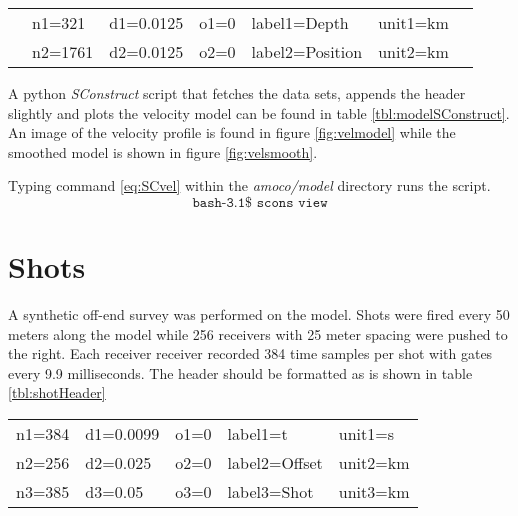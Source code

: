 \begin{center}
{
\begin{tabular}[t]{|clllllc|}
        \hline
          &  n1=321   &      d1=0.0125    &   o1=0        &       label1=Depth  &       unit1=km &  \\
          &  n2=1761  &      d2=0.0125    &   o2=0        &       label2=Position &     unit2=km &  \\
        \hline
\end{tabular}
}
\end{center}

A python \emph{SConstruct} script that fetches the data sets, appends the header slightly and plots the velocity model can be found in table \ref{tbl:modelSConstruct}.  An image of the velocity profile is found in figure \ref{fig:velmodel} while the smoothed model is shown in figure \ref{fig:velsmooth}. 

{
\tiny

\normalsize
}

Typing command \ref{eq:SCvel} within the \emph{amoco\slash model} directory runs the script.
\begin{equation}\label{eq:SCvel} \texttt{bash-3.1\$\ scons\ view} \end{equation}


\section{Shots}
A synthetic off-end survey was performed on the model.  Shots were fired every 50 meters along the model while 256 receivers with 25 meter spacing were pushed to the right.  Each receiver receiver recorded 384 time samples per shot with gates every 9.9 milliseconds.  The header should be formatted as is shown in table \ref{tbl:shotHeader} 

{
\begin{tabular}[frame=single]{|lllll|}
        \hline
    n1=384  &       d1=0.0099  &    o1=0  &        label1=t       &   unit1=s  \\
    n2=256  &       d2=0.025   &    o2=0  &        label2=Offset  &   unit2=km   \\
    n3=385  &       d3=0.05    &    o3=0  &        label3=Shot    &   unit3=km   \\
        \hline
\end{tabular}
}

